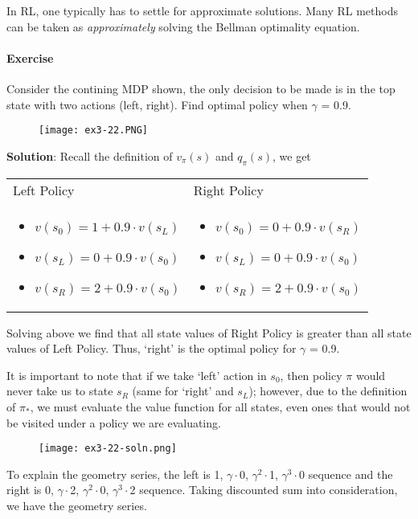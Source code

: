 \documentclass[lang=en,mode=geye,device=normal,color=blue,14pt]{elegantnote}
\DeclareMathOperator*{\1}{\mathbbm{1}}
\begin{document}
In RL, one typically has to settle for approximate solutions. Many RL methods can be taken as \textit{approximately} solving the Bellman optimality equation.

\paragraph{Exercise} Consider the contining MDP shown, the only decision to be made is in the top state with two actions (left, right).
Find optimal policy when $\gamma$ = 0.9.

\begin{figure}[!h]
  \centering
  \texttt{[image: ex3-22.PNG]}
  \label{fig:ex3-22}
\end{figure}

\textbf{Solution}: Recall the definition of $v_\pi(s)$ and $q_\pi(s)$, we get

\begin{table}[h!]
\begin{tabular}{p{}p{}}
Left Policy & Right Policy \\
\begin{itemize}
\item $ v(s_0) = 1 + 0.9\cdot v(s_L) $
\item $ v(s_L) = 0 + 0.9\cdot v(s_0) $
\item $ v(s_R) = 2 + 0.9\cdot v(s_0) $
\end{itemize} & \begin{itemize}
\item $ v(s_0) = 0 + 0.9\cdot v(s_R) $
\item $ v(s_L) = 0 + 0.9\cdot v(s_0) $
\item $ v(s_R) = 2 + 0.9\cdot v(s_0) $
\end{itemize}  
\end{tabular}
\end{table}
Solving above we find that all state values of Right Policy is greater than all state values of Left Policy. Thus, `right' is the optimal policy for $\gamma$ = 0.9.

It is important to note that if we take `left' action in $s_0$, then policy $\pi$ would never take us to state $s_R$ (same for `right' and $s_L$); however, due to the definition of $\pi_*$, we must evaluate the value function for all states, even ones that would not be visited under a policy we are evaluating.

\begin{figure}[!h]
  \centering
  \texttt{[image: ex3-22-soln.png]}
  \label{fig:ex3-22-soln}
\end{figure}
To explain the geometry series, the left is 1, $\gamma\cdot$0, $\gamma^2\cdot$1, $\gamma^3\cdot$0 sequence and the right is 0, $\gamma\cdot$2, $\gamma^2\cdot$0, $\gamma^3\cdot$2 sequence. Taking discounted sum into consideration, we have the geometry series.
\end{document}
